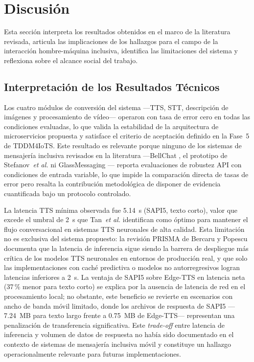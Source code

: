 \documentclass[journal]{IEEEtran}
\begin{document}
	\section{Discusi\'on}
	\label{sec:discusion}
		Esta secci\'on interpreta los resultados obtenidos en el marco de la literatura revisada, articula las implicaciones de los hallazgos para el campo de la interacci\'on hombre-m\'aquina inclusiva, identifica las limitaciones del sistema y reflexiona sobre el alcance social del trabajo.
		
		\subsection{Interpretaci\'on de los Resultados T\'ecnicos}
			Los cuatro m\'odulos de conversi\'on del sistema ---TTS, STT, descripci\'on de im\'agenes y procesamiento de v\'ideo--- operaron con tasa de error cero en todas las condiciones evaluadas, lo que valida la estabilidad de la arquitectura de microservicios propuesta y satisface el criterio de aceptaci\'on definido en la Fase~5 de TDDM4IoTS. Este resultado es relevante porque ninguno de los sistemas de mensajer\'ia inclusiva revisados en la literatura ---BellChat \cite{guerrero2021bellchat}, el prototipo de Stefanov~\textit{et al.} \cite{stefanov2024} ni GlassMessaging \cite{janaka2023}--- reporta evaluaciones de robustez API con condiciones de entrada variable, lo que impide la comparaci\'on directa de tasas de error pero resalta la contribuci\'on metodol\'ogica de disponer de evidencia cuantificada bajo un protocolo controlado.
			
			La latencia TTS m\'inima observada fue 5.14~s (SAPI5, texto corto), valor que excede el umbral de 2~s que Tan~\textit{et al.} \cite{tan2021} identifican como \'optimo para mantener el flujo conversacional en sistemas TTS neuronales de alta calidad. Esta limitaci\'on no es exclusiva del sistema propuesto: la revisi\'on PRISMA de Bercaru y Popescu \cite{bercaru2024} documenta que la latencia de inferencia sigue siendo la barrera de despliegue m\'as cr\'itica de los modelos TTS neuronales en entornos de producci\'on real, y que solo las implementaciones con cach\'e predictiva o modelos no autorregresivos logran latencias inferiores a 2~s. La ventaja de SAPI5 sobre Edge-TTS en latencia neta (37\,\% menor para texto corto) se explica por la ausencia de latencia de red en el procesamiento local; no obstante, este beneficio se revierte en escenarios con ancho de banda m\'ovil limitado, donde los archivos de respuesta de SAPI5 ---7.24~MB para texto largo frente a 0.75~MB de Edge-TTS--- representan una penalizaci\'on de transferencia significativa. Este \textit{trade-off} entre latencia de inferencia y volumen de datos de respuesta no hab\'ia sido documentado en el contexto de sistemas de mensajer\'ia inclusiva m\'ovil y constituye un hallazgo operacionalmente relevante para futuras implementaciones.
			
\end{document}
